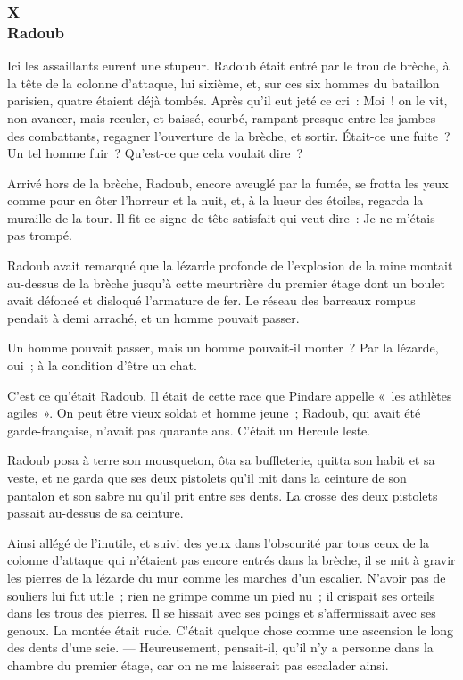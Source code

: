 \documentclass[french,twoside]{book} %
\begin{document}
 \subsubsection[{X. Radoub}]{X \\
Radoub}
\label{p3l4c10}
\noindent Ici les assaillants eurent une stupeur. Radoub était entré par le trou de brèche, à la tête de la colonne d’attaque, lui sixième, et, sur ces six hommes du bataillon parisien, quatre étaient déjà tombés. Après qu’il eut jeté ce cri : Moi ! on le vit, non avancer, mais reculer, et baissé, courbé, rampant presque entre les jambes des combattants, regagner l’ouverture de la brèche, et sortir. Était-ce une fuite ? Un tel homme fuir ? Qu’est-ce que cela voulait dire ?\par
Arrivé hors de la brèche, Radoub, encore aveuglé par la fumée, se frotta les yeux comme pour en ôter l’horreur et la nuit, et, à la lueur des étoiles, regarda la muraille de la tour. Il fit ce signe de tête satisfait qui veut dire : Je ne m’étais pas trompé.\par
Radoub avait remarqué que la lézarde profonde de l’explosion de la mine montait au-dessus de la brèche jusqu’à cette meurtrière du premier étage dont un boulet avait défoncé et disloqué l’armature de fer. Le réseau des barreaux rompus pendait à demi arraché, et un homme pouvait passer.\par
Un homme pouvait passer, mais un homme  pouvait-il monter ? Par la lézarde, oui ; à la condition d’être un chat.\par
C’est ce qu’était Radoub. Il était de cette race que Pindare appelle « les athlètes agiles ». On peut être vieux soldat et homme jeune ; Radoub, qui avait été garde-française, n’avait pas quarante ans. C’était un Hercule leste.\par
Radoub posa à terre son mousqueton, ôta sa buffleterie, quitta son habit et sa veste, et ne garda que ses deux pistolets qu’il mit dans la ceinture de son pantalon et son sabre nu qu’il prit entre ses dents. La crosse des deux pistolets passait au-dessus de sa ceinture.\par
Ainsi allégé de l’inutile, et suivi des yeux dans l’obscurité par tous ceux de la colonne d’attaque qui n’étaient pas encore entrés dans la brèche, il se mit à gravir les pierres de la lézarde du mur comme les marches d’un escalier. N’avoir pas de souliers lui fut utile ; rien ne grimpe comme un pied nu ; il crispait ses orteils dans les trous des pierres. Il se hissait avec ses poings et s’affermissait avec ses genoux. La montée était rude. C’était quelque chose comme une ascension le long des dents d’une scie. — Heureusement, pensait-il, qu’il n’y a personne dans la chambre du premier étage, car on ne me laisserait pas escalader ainsi.\par
\end{document}
